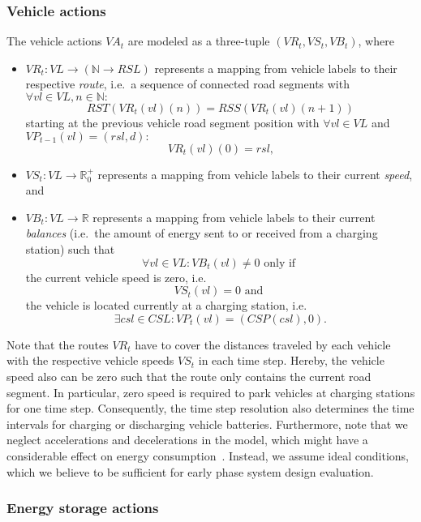 \subsubsection{Vehicle actions}
\label{actions_vehicles}

The vehicle actions $VA_t$ are modeled as a three-tuple $(VR_t, VS_t, VB_t)$, where
\begin{itemize}
	\item $VR_t: VL \rightarrow (\mathbb{N} \rightarrow RSL)$ represents a mapping from vehicle labels to their respective \textit{route}, i.e.\ a sequence of connected road segments with $\forall vl \in VL, n \in \mathbb{N}:$
	\[
		RST(VR_t(vl)(n)) = RSS(VR_t(vl)(n + 1))
	\]
	starting at the previous vehicle road segment position with $\forall vl \in VL$ and $VP_{t-1}(vl) = (rsl, d):$
	\[
		VR_t(vl)(0) = rsl \textrm{,}
	\]
	\item $VS_t: VL \rightarrow \mathbb{R}_0^+$ represents a mapping from vehicle labels to their current \textit{speed}, and
	\item $VB_t: VL \rightarrow \mathbb{R}$ represents a mapping from vehicle labels to their current \textit{balances} (i.e.\ the amount of energy sent to or received from a charging station) such that
	\[
		\forall vl \in VL: VB_t(vl) \neq 0 \textrm{ only if }
	\]
	the current vehicle speed is zero, i.e.\
	\[
		 VS_t(vl) = 0 \textrm{ and }
	\]
	the vehicle is located currently at a charging station, i.e.\
	\[
		\exists csl \in CSL: VP_t(vl) = (CSP(csl), 0) \textrm{.}
	\]
\end{itemize}
Note that the routes $VR_t$ have to cover the distances traveled by each vehicle with the respective vehicle speeds $VS_t$ in each time step. Hereby, the vehicle speed also can be zero such that the route only contains the current road segment. In particular, zero speed is required to park vehicles at charging stations for one time step. Consequently, the time step resolution also determines the time intervals for charging or discharging vehicle batteries. Furthermore, note that we neglect accelerations and decelerations in the model, which might have a considerable effect on energy consumption~\cite{gao2007modeling}. Instead, we assume ideal conditions, which we believe to be sufficient for early phase system design evaluation.

\subsubsection{Energy storage actions}
\label{actions_storages}

